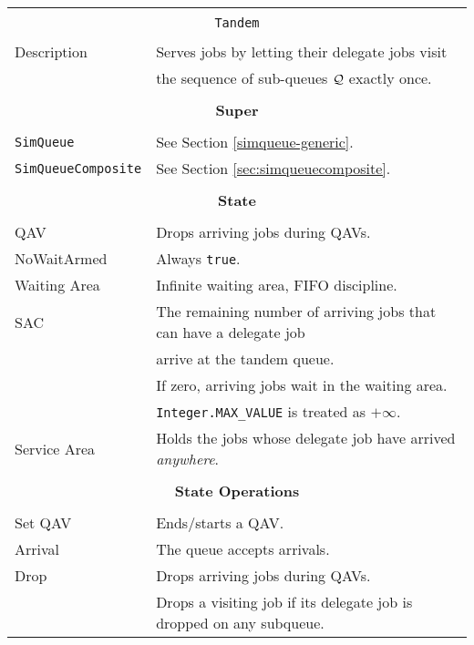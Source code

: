 \begin{tabular}{|l|l|}
\hline
\multicolumn{2}{|c|}{} \\
\multicolumn{2}{|c|}{\lstinline[basicstyle=\large]{Tandem}} \\
\multicolumn{2}{|c|}{} \\
\hline
Description & Serves jobs by letting their delegate jobs visit \\
            & the sequence of sub-queues $\cal{Q}$ exactly once. \\
\hline
\multicolumn{2}{|c|}{} \\
\multicolumn{2}{|c|}{\bf Super} \\
\multicolumn{2}{|c|}{} \\
\hline
	\lstinline|SimQueue| & See Section \ref{simqueue-generic}. \\
	\lstinline|SimQueueComposite| & See Section \ref{sec:simqueuecomposite}. \\
\hline
\multicolumn{2}{|c|}{} \\
\multicolumn{2}{|c|}{\bf State} \\
\multicolumn{2}{|c|}{} \\
\hline
QAV & Drops arriving jobs during QAVs. \\
\hline
NoWaitArmed & Always \lstinline|true|. \\
\hline
Waiting Area & Infinite waiting area, FIFO discipline. \\
\hline
SAC & The remaining number of arriving jobs that can have a delegate job \\
    & arrive at the tandem queue. \\
    & If zero, arriving jobs wait in the waiting area. \\
    & \lstinline|Integer.MAX_VALUE| is treated as $+\infty$. \\
\hline
Service Area & Holds the jobs whose delegate job have arrived {\em anywhere}. \\
\hline
\multicolumn{2}{|c|}{} \\
\multicolumn{2}{|c|}{\bf State Operations} \\
\multicolumn{2}{|c|}{} \\
\hline
Set QAV & Ends/starts a QAV. \\
\hline
Arrival & The queue accepts arrivals. \\
\hline
Drop & Drops arriving jobs during QAVs. \\
     & Drops a visiting job if its delegate job is dropped on any subqueue. \\
\hline

\end{tabular}
